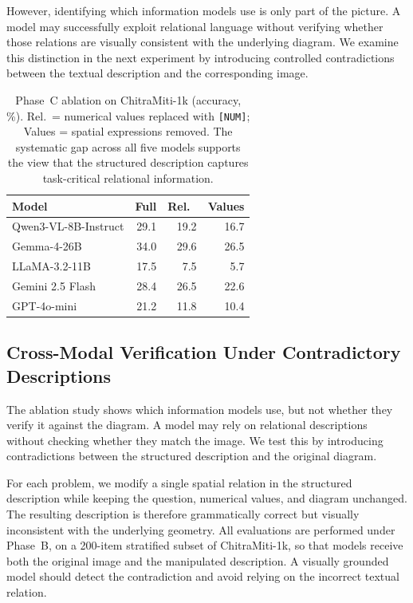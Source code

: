 \documentclass[11pt]{article}
\begin{document}
However, identifying which information models use is only part of the picture. A model may successfully exploit relational language without verifying whether those relations are visually consistent with the underlying diagram. We examine this distinction in the next experiment by introducing controlled contradictions between the textual description and the corresponding image.

\begin{table}[t]
\centering\small
\begin{tabular}{lrrr}
\toprule
Model & Full & Rel.\ & Values \\
\midrule
Qwen3-VL-8B-Instruct & 29.1 & 19.2 & 16.7 \\
Gemma-4-26B & 34.0 & 29.6 & 26.5 \\
LLaMA-3.2-11B & 17.5 & 7.5 & 5.7 \\
Gemini 2.5 Flash & 28.4 & 26.5 & 22.6 \\
GPT-4o-mini & 21.2 & 11.8 & 10.4 \\
\bottomrule
\end{tabular}
\caption{Phase~C ablation on ChitraMiti-1k (accuracy, \%). Rel.\ = numerical values replaced with \texttt{[NUM]}; Values = spatial expressions removed. The systematic gap across all five models supports the view that the structured description captures task-critical relational information.}
\label{tab:ablation}
\end{table}

\subsection{Cross-Modal Verification Under Contradictory Descriptions}
\label{ssec:adversarial}

The ablation study shows which information models use, but not whether they verify it against the diagram. A model may rely on relational descriptions without checking whether they match the image. We test this by introducing contradictions between the structured description and the original diagram.

For each problem, we modify a single spatial relation in the structured description while keeping the question, numerical values, and diagram unchanged. The resulting description is therefore grammatically correct but visually inconsistent with the underlying geometry. All evaluations are performed under Phase~B, on a 200-item stratified subset of ChitraMiti-1k, so that models receive both the original image and the manipulated description. A visually grounded model should detect the contradiction and avoid relying on the incorrect textual relation.
\end{document}
